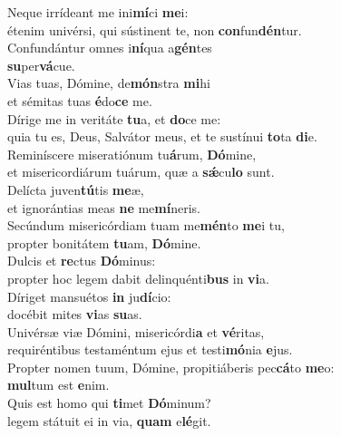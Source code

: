 \evenverse Neque irrídeant me ini\textbf{mí}ci \textbf{me}i:~\*\\
\evenverse étenim univérsi, qui sústinent te, non \textbf{con}fun\textbf{dén}tur.\\
\oddverse Confundántur omnes i\textbf{ní}qua a\textbf{gén}tes~\*\\
\oddverse \textbf{su}per\textbf{vá}cue.\\
\evenverse Vias tuas, Dómine, de\textbf{món}stra \textbf{mi}hi~\*\\
\evenverse et sémitas tuas \textbf{é}do\textbf{ce} me.\\
\oddverse Dírige me in veritáte \textbf{tu}a, et \textbf{do}ce me:~\*\\
\oddverse quia tu es, Deus, Salvátor meus, et te sustínui \textbf{to}ta \textbf{di}e.\\
\evenverse Reminíscere miseratiónum tu\textbf{á}rum, \textbf{Dó}mine,~\*\\
\evenverse et misericordiárum tuárum, quæ a \textbf{sǽ}cu\textbf{lo} sunt.\\
\oddverse Delícta juven\textbf{tú}tis \textbf{me}æ,~\*\\
\oddverse et ignorántias meas \textbf{ne} me\textbf{mí}neris.\\
\evenverse Secúndum misericórdiam tuam me\textbf{mén}to \textbf{me}i tu,~\*\\
\evenverse propter bonitátem \textbf{tu}am, \textbf{Dó}mine.\\
\oddverse Dulcis et \textbf{re}ctus \textbf{Dó}minus:~\*\\
\oddverse propter hoc legem dabit delinquénti\textbf{bus} in \textbf{vi}a.\\
\evenverse Díriget mansuétos \textbf{in} ju\textbf{dí}cio:~\*\\
\evenverse docébit mites \textbf{vi}as \textbf{su}as.\\
\oddverse Univérsæ viæ Dómini, misericórdi\textbf{a} et \textbf{vé}ritas,~\*\\
\oddverse requiréntibus testaméntum ejus et testi\textbf{mó}nia \textbf{e}jus.\\
\evenverse Propter nomen tuum, Dómine, propitiáberis pec\textbf{cá}to \textbf{me}o:~\*\\
\evenverse \textbf{mul}tum est \textbf{e}nim.\\
\oddverse Quis est homo qui \textbf{ti}met \textbf{Dó}minum?~\*\\
\oddverse legem státuit ei in via, \textbf{quam} e\textbf{lé}git.\\
